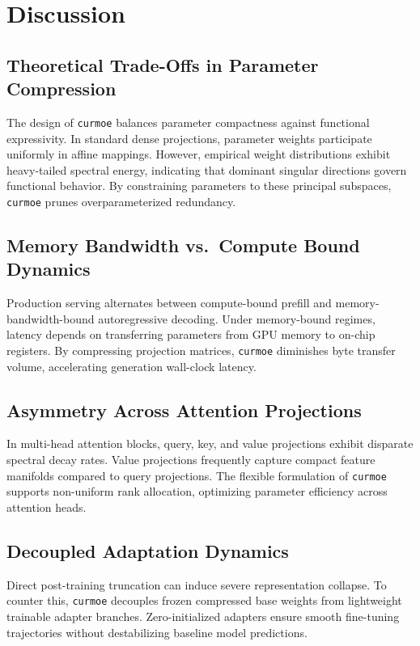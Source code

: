 \section{Discussion}

\subsection{Theoretical Trade-Offs in Parameter Compression}
The design of \texttt{curmoe} balances parameter compactness against functional expressivity. In standard dense projections, parameter weights participate uniformly in affine mappings. However, empirical weight distributions exhibit heavy-tailed spectral energy, indicating that dominant singular directions govern functional behavior. By constraining parameters to these principal subspaces, \texttt{curmoe} prunes overparameterized redundancy.

\subsection{Memory Bandwidth vs.\ Compute Bound Dynamics}
Production serving alternates between compute-bound prefill and memory-bandwidth-bound autoregressive decoding. Under memory-bound regimes, latency depends on transferring parameters from GPU memory to on-chip registers. By compressing projection matrices, \texttt{curmoe} diminishes byte transfer volume, accelerating generation wall-clock latency.

\subsection{Asymmetry Across Attention Projections}
In multi-head attention blocks, query, key, and value projections exhibit disparate spectral decay rates. Value projections frequently capture compact feature manifolds compared to query projections. The flexible formulation of \texttt{curmoe} supports non-uniform rank allocation, optimizing parameter efficiency across attention heads.

\subsection{Decoupled Adaptation Dynamics}
Direct post-training truncation can induce severe representation collapse. To counter this, \texttt{curmoe} decouples frozen compressed base weights from lightweight trainable adapter branches. Zero-initialized adapters ensure smooth fine-tuning trajectories without destabilizing baseline model predictions.

